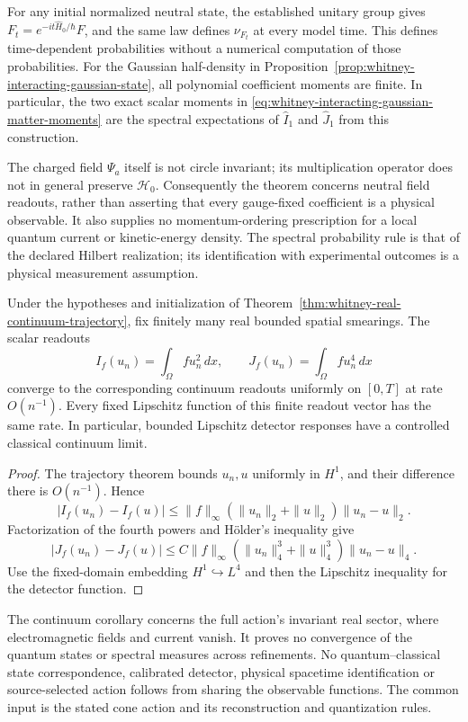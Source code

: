 For any initial normalized neutral state, the established unitary group
gives \(F_t=e^{-it\widehat H_0/\hbar}F\), and the same law defines
\(\nu_{F_t}\) at every model time. This defines time-dependent
probabilities without a numerical computation of those
probabilities. For the Gaussian half-density in
Proposition~\ref{prop:whitney-interacting-gaussian-state}, all polynomial
coefficient moments are finite. In particular, the two exact scalar
moments in \eqref{eq:whitney-interacting-gaussian-matter-moments} are
the spectral expectations of \(\widehat I_1\) and \(\widehat J_1\)
from this construction.

The charged field \(\Psi_a\) itself is not circle invariant; its
multiplication operator does not in general preserve \(\mathcal H_0\).
Consequently the theorem concerns neutral field readouts, rather than
asserting that every gauge-fixed coefficient is a physical observable.
It also supplies no momentum-ordering prescription for a local quantum
current or kinetic-energy density. The spectral probability rule is that
of the declared Hilbert realization; its identification with experimental
outcomes is a physical measurement assumption.

\begin{proposition}
\label{cor:whitney-continuum-detector-readouts}
Under the hypotheses and initialization of
Theorem~\ref{thm:whitney-real-continuum-trajectory}, fix finitely many real
bounded spatial smearings. The scalar readouts
\[
 I_f(u_n)=\int_\Omega f u_n^2\,dx,\qquad
 J_f(u_n)=\int_\Omega f u_n^4\,dx
\]
converge to the corresponding continuum readouts uniformly on \([0,T]\)
at rate \(O(n^{-1})\). Every fixed Lipschitz function of this finite
readout vector has the same rate. In particular, bounded Lipschitz
detector responses have a controlled classical continuum limit.
\end{proposition}
\begin{proof}
The trajectory theorem bounds \(u_n,u\) uniformly in \(H^1\), and
their difference there is \(O(n^{-1})\). Hence
\[
 |I_f(u_n)-I_f(u)|
 \leq\|f\|_\infty(\|u_n\|_2+\|u\|_2)\|u_n-u\|_2.
\]
Factorization of the fourth powers and H\"older's inequality give
\[
 |J_f(u_n)-J_f(u)|
 \leq C\|f\|_\infty(\|u_n\|_4^3+\|u\|_4^3)
                                      \|u_n-u\|_4.
\]
Use the fixed-domain embedding \(H^1\hookrightarrow L^4\) and then
the Lipschitz inequality for the detector function.
\end{proof}

The continuum corollary concerns the full action's invariant real sector,
where electromagnetic fields and current vanish. It proves no convergence
of the quantum states or spectral measures across refinements. No
quantum--classical state correspondence, calibrated detector, physical
spacetime identification or source-selected action follows from sharing
the observable functions. The common input is the stated cone action and
its reconstruction and quantization rules.
